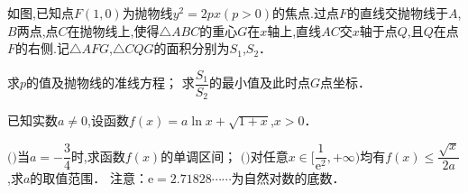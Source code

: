 \question[12] 如图,已知点$F(1 , 0)$为抛物线$y ^{2} =2px(p  \gt  0)$的焦点$.$过点$F$的直线交抛物线于$A$,$B$两点,点$C$在抛物线上,使得$\triangle ABC$的重心$G$在$x$轴上,直线$AC$交$x$轴于点$Q$,且$Q$在点$F$的右侧$.$记$\triangle AFG$,$\triangle CQG$的面积分别为$S _{1}$,$S _{2}$．
\begin{subquestions}
    \subquestion 求$p$的值及抛物线的准线方程；
    \subquestion 求$ \dfrac {S_{1}}{S_{2}}$的最小值及此时点$G$点坐标．
\end{subquestions}

\begin{solution}{6cm}

\end{solution}
\question[15] 已知实数$a\neq 0$,设函数$f(x)=a\ln x+ \sqrt {1+x}$,$x  \gt  0$．
\begin{subquestions}
    \subquestion $($$)$当$a=- \dfrac {3}{4}$时,求函数$f(x)$的单调区间；
    \subquestion $($$)$对任意$x \in \Big[ \dfrac {1}{\mathrm e^{2}} , + \infty \Big)$均有$f(x)\leqslant \dfrac { \sqrt {x}}{2a}$,求$a$的取值范围．
    \subquestion 注意：$\mathrm e=2.71828 \cdots  \cdots $为自然对数的底数．
\end{subquestions}
\begin{solution}{6cm}

\end{solution}

